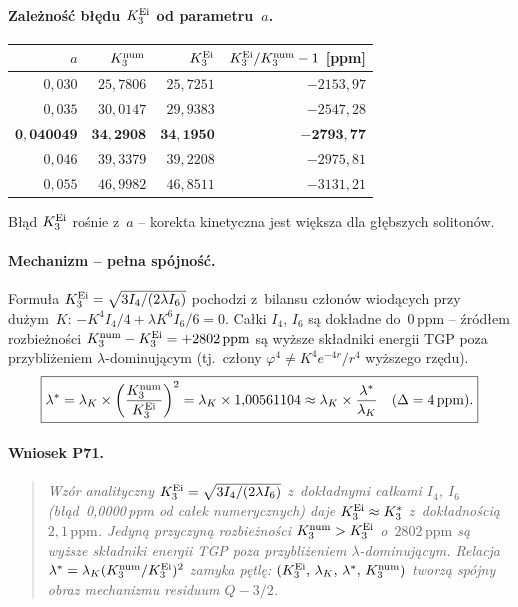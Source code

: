 \paragraph{Zale\.zno\'s\'c b\l{}\k{e}du $K_3^{\rm Ei}$ od parametru~$a$.}
\begin{center}
\begin{tabular}{r|r|r|r}
\hline
$a$ & $K_3^{\rm num}$ & $K_3^{\rm Ei}$ & $K_3^{\rm Ei}/K_3^{\rm num}-1$ [ppm] \\
\hline
$0{,}030$ & $25{,}7806$ & $25{,}7251$ & $-2153{,}97$ \\
$0{,}035$ & $30{,}0147$ & $29{,}9383$ & $-2547{,}28$ \\
$\mathbf{0{,}040049}$ & $\mathbf{34{,}2908}$ & $\mathbf{34{,}1950}$ & $\mathbf{-2793{,}77}$ \\
$0{,}046$ & $39{,}3379$ & $39{,}2208$ & $-2975{,}81$ \\
$0{,}055$ & $46{,}9982$ & $46{,}8511$ & $-3131{,}21$ \\
\hline
\end{tabular}
\end{center}
B\l{}\k{a}d $K_3^{\rm Ei}$ ro\'snie z~$a$ -- korekta kinetyczna jest wi\k{e}ksza dla g\l{}\k{e}bszych soliton\'ow.

\paragraph{Mechanizm -- pe\l{}na sp\'ojno\'s\'c.}
Formu\l{}a $K_3^{\rm Ei}=\sqrt{3I_4/(2\lambda I_6)}$ pochodzi z~bilansu cz\l{}on\'ow wiod\k{a}cych
przy du\.zym~$K$: $-K^4I_4/4 + \lambda K^6 I_6/6 = 0$.
Ca\l{}ki $I_4$, $I_6$ s\k{a} dok\l{}adne do~0\,ppm -- \'zr\'od\l{}em rozbie\.zno\'sci
$K_3^{\rm num}-K_3^{\rm Ei}=+2802\,\mathrm{ppm}$ s\k{a} wy\.zsze sk\l{}adniki energii TGP
poza przybli\.zeniem $\lambda$-dominuj\k{a}cym
(tj.\ cz\l{}ony $\varphi^4 \neq K^4 e^{-4r}/r^4$ wy\.zszego rz\k{e}du).
\[
  \boxed{%
    \lambda^* = \lambda_K \times \left(\frac{K_3^{\rm num}}{K_3^{\rm Ei}}\right)^2
    = \lambda_K \times 1{,}00561104
    \approx \lambda_K \times \frac{\lambda^*}{\lambda_K}
    \quad (\Delta = 4\,\mathrm{ppm}).
  }
\]

\paragraph{Wniosek P71.}
\begin{quote}
\emph{Wz\'or analityczny $K_3^{\rm Ei} = \sqrt{3I_4/(2\lambda I_6)}$ z~dok\l{}adnymi ca\l{}kami
$I_4$, $I_6$ (b\l{}\k{a}d~0{,}0000\,ppm od ca\l{}ek numerycznych) daje $K_3^{\rm Ei} \approx K_3^*$
z~dok\l{}adno\'sci\k{a} $2{,}1\,\mathrm{ppm}$.
Jedyn\k{a} przyczyn\k{a} rozbie\.zno\'sci $K_3^{\rm num} > K_3^{\rm Ei}$ o~$2802\,\mathrm{ppm}$
s\k{a} wy\.zsze sk\l{}adniki energii TGP poza przybli\.zeniem $\lambda$-dominuj\k{a}cym.
Relacja $\lambda^* = \lambda_K(K_3^{\rm num}/K_3^{\rm Ei})^2$ zamyka p\k{e}tl\k{e}:
$(K_3^{\rm Ei},\,\lambda_K,\,\lambda^*,\,K_3^{\rm num})$ tworz\k{a} sp\'ojny obraz mechanizmu
residuum $Q-3/2$.}
\end{quote}

